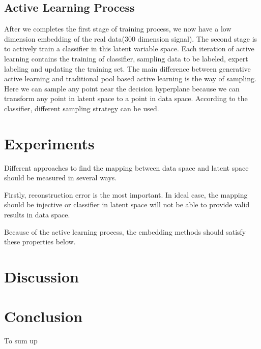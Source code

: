 \documentclass[letterpaper]{article}
\begin{document}
\subsection{Active Learning Process}
After we completes the first stage of training process, we now have a low dimension embedding of the real data(300 dimension signal). The second stage is to actively train a classifier in this latent variable space. Each iteration of active learning contains the training of classifier, sampling data to be labeled, expert labeling and updating the training set. The main difference between generative active learning and traditional pool based active learning is the way of sampling. Here we can sample any point near the decision hyperplane because we can transform any point in latent space to a point in data space. According to the classifier, different sampling strategy can be used.

\section{Experiments}
Different approaches to find the mapping between data space and latent space should be measured in several ways.

Firstly, reconstruction error is the most important. In ideal case, the mapping should be injective or classifier in latent space will not be able to provide valid results in data space.

Because of the active learning process, the embedding methods should satisfy these properties below.

\section{Discussion}

\section{Conclusion}
To sum up



\end{document}
